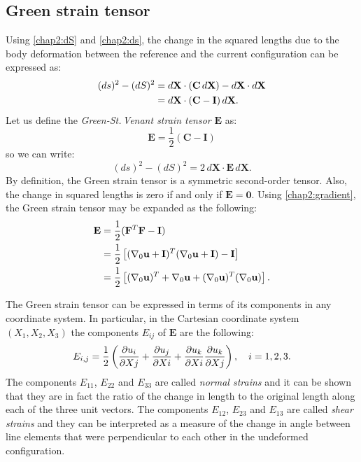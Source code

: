 	\subsection{Green strain tensor}
Using \eqref{chap2:dS} and \eqref{chap2:ds}, the change in the squared lengths due to the body deformation between the reference and the current configuration can be expressed as:
\begin{align}
(ds)^2 - (dS)^2 &= d\mathbf{X} \cdot (\mathbf{C} \, d\mathbf{X}) - d\mathbf{X} \cdot d\mathbf{X} \notag \\
&= d\mathbf{X} \cdot  (\mathbf{C} - \mathbf{I}) \, d\mathbf{X}.
\end{align}
Let us define the \emph{Green-St.\,Venant strain tensor} $\mathbf{E}$ as:
\begin{equation}
\mathbf{E} = \frac{1}{2}	 (\mathbf{C} - \mathbf{I})
\end{equation}
so we can write:
\begin{equation}
(ds)^2 - (dS)^2 = 2 \, d\mathbf{X} \cdot \mathbf{E} \, d\mathbf{X}.
\end{equation}
By definition, the Green strain tensor is a symmetric second-order tensor. Also, the change in squared lengths is zero if and only if $\mathbf{E} = \mathbf{0}$. Using \eqref{chap2:gradient}, the Green strain tensor may be expanded as the following:
\begin{align}
\mathbf{E} &= \frac{1}{2} (\mathbf{F}^T \mathbf{F} - \mathbf{I}) \notag \\
&= \frac{1}{2} \left[ (\nabla_{0} \mathbf{u} + \mathbf{I})^T (\nabla_{0} \mathbf{u} + \mathbf{I}) - \mathbf{I} \right] \notag \\
&= \frac{1}{2} \left[ (\nabla_{0} \mathbf{u})^T  + \nabla_{0} \mathbf{u}+ (\nabla_{0} \mathbf{u})^T(\nabla_{0} \mathbf{u}) \right]. \label{chap2:GreenTensor}
\end{align}

The Green strain tensor can be expressed in terms of its components in any coordinate system. In particular, in the Cartesian coordinate system $(X_1, X_2, X_3)$ the components $E_{ij}$ of $\mathbf{E}$ are the following:
\begin{equation}
E_{i,j} = \frac{1}{2} \left( \dfrac{\partial u_i}{\partial Xj} + \dfrac{\partial u_j}{\partial Xi} + \dfrac{\partial u_k}{\partial Xi} \dfrac{\partial u_k}{\partial Xj} \right), \quad i = 1, 2, 3.
\end{equation}
The components $E_{11}$, $E_{22}$ and $E_{33}$ are called \emph{normal strains} and it can be shown that they are in fact the ratio of the change in length to the original length along each of the three unit vectors. The components $E_{12}$, $E_{23}$ and $E_{13}$ are called \emph{shear strains} and they can be interpreted as a measure of the change in angle between line elements that were perpendicular to each other in the undeformed configuration. 

